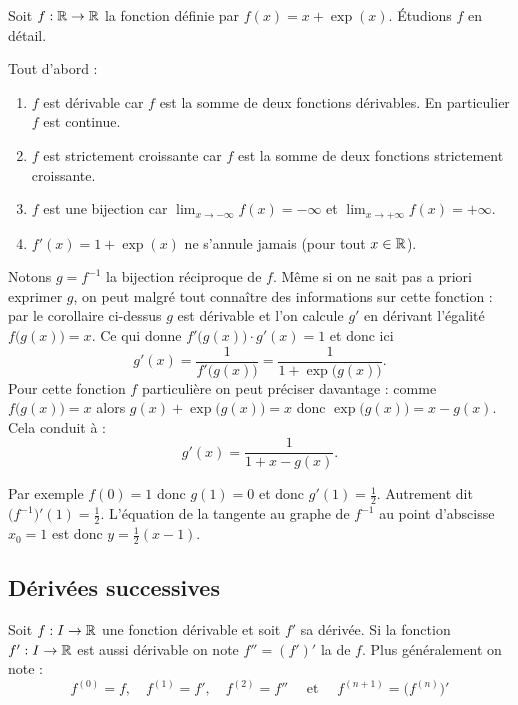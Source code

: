 \documentclass[class=report,crop=false]{standalone}
\begin{document}
\begin{exemple}
Soit $f : \mathbb{R} \to \mathbb{R}$ la fonction définie par $f(x)=x+\exp(x)$.
\'Etudions $f$ en détail.

Tout d'abord :
\begin{enumerate}
  \item $f$ est dérivable car $f$ est la somme de deux fonctions dérivables. En particulier $f$ est continue.
  \item $f$ est strictement croissante car $f$ est la somme de deux fonctions strictement croissante.
  \item $f$ est une bijection car $\lim_{x\to-\infty} f(x)=-\infty$ et $\lim_{x\to+\infty} f(x)=+\infty$.
  \item $f'(x) = 1 + \exp(x)$ ne s'annule jamais (pour tout $x\in \mathbb{R}$).
\end{enumerate}

\bigskip

Notons $g = f^{-1}$ la bijection réciproque de $f$. Même si on ne sait pas a priori exprimer $g$, on peut malgré tout connaître des informations sur
cette fonction : par le corollaire ci-dessus $g$ est dérivable
et l'on calcule $g'$ en dérivant l'égalité $f\big( g(x) \big)  = x$. Ce qui donne
$f'\big(g(x)\big) \cdot g'(x) = 1$
et donc ici
$$g'(x) = \frac{1}{f'\big( g(x) \big)} = \frac{1}{1+\exp\big( g(x) \big)}.$$
Pour cette fonction $f$ particulière on peut préciser davantage :
comme  $f\big( g(x)\big) = x$ alors $g(x)+\exp\big( g(x) \big)=x$ donc
$\exp\big( g(x) \big)=x-g(x)$. Cela conduit à :
$$g'(x) =  \frac{1}{1+x -g(x)}.$$

\bigskip


Par exemple  $f(0)=1$ donc $g(1)=0$ et donc $g'(1)=\frac12$.
Autrement dit $\big(f^{-1}\big)'(1)= \frac{1}{2}$. L'équation de la tangente
au graphe de $f^{-1}$ au point d'abscisse $x_0=1$ est donc $y=\frac12 (x-1)$.
\end{exemple}


\subsection{Dérivées successives}

Soit $f : I \to \mathbb{R}$ une fonction dérivable et soit $f'$ sa dérivée.
Si la fonction $f' : I \to \mathbb{R}$ est aussi dérivable on note
$f''=(f')'$ la  de $f$.
Plus généralement on note :
$$f^{(0)} = f, \quad f^{(1)} = f', \quad f^{(2)} = f'' \quad \text{ et } \quad f^{(n+1)} = \big(f^{(n)}\big)'$$
\end{document}
